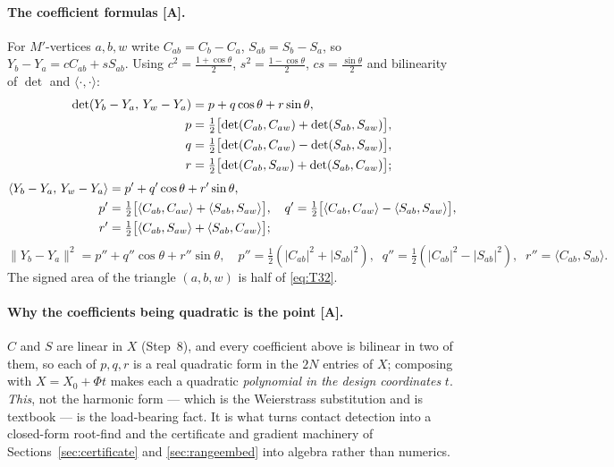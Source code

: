 \documentclass[11pt,a4paper]{article}
\theoremstyle{definition}
\newcommand{\Mprime}{M'}
\begin{document}
\paragraph{The coefficient formulas [A].} For $\Mprime$-vertices $a,b,w$ write
$C_{ab}=C_b-C_a$, $S_{ab}=S_b-S_a$, so $Y_b-Y_a=cC_{ab}+sS_{ab}$. Using
$c^2=\tfrac{1+\cos\theta}{2}$, $s^2=\tfrac{1-\cos\theta}{2}$, $cs=\tfrac{\sin\theta}{2}$ and
bilinearity of $\det$ and $\langle\cdot,\cdot\rangle$:
\begin{align}
\det(Y_b-Y_a,\,Y_w-Y_a) &= p+q\cos\theta+r\sin\theta, \notag\\
p &= \tfrac12\bigl[\det(C_{ab},C_{aw})+\det(S_{ab},S_{aw})\bigr], \notag\\
q &= \tfrac12\bigl[\det(C_{ab},C_{aw})-\det(S_{ab},S_{aw})\bigr],
\label{eq:T32}\\
r &= \tfrac12\bigl[\det(C_{ab},S_{aw})+\det(S_{ab},C_{aw})\bigr]; \notag
\end{align}
\begin{align}
\langle Y_b-Y_a,\,Y_w-Y_a\rangle &= p'+q'\cos\theta+r'\sin\theta, \notag\\
p' &= \tfrac12\bigl[\langle C_{ab},C_{aw}\rangle+\langle S_{ab},S_{aw}\rangle\bigr],\quad
q' = \tfrac12\bigl[\langle C_{ab},C_{aw}\rangle-\langle S_{ab},S_{aw}\rangle\bigr],
\label{eq:T33}\\
r' &= \tfrac12\bigl[\langle C_{ab},S_{aw}\rangle+\langle S_{ab},C_{aw}\rangle\bigr];\notag
\end{align}
\begin{equation}
\|Y_b-Y_a\|^2 = p''+q''\cos\theta+r''\sin\theta,\quad
p''=\tfrac12(|C_{ab}|^2+|S_{ab}|^2),\;\;
q''=\tfrac12(|C_{ab}|^2-|S_{ab}|^2),\;\;
r''=\langle C_{ab},S_{ab}\rangle .
\label{eq:T34}
\end{equation}
The signed area of the triangle $(a,b,w)$ is half of \eqref{eq:T32}.

\paragraph{Why the coefficients being quadratic is the point [A].} $C$ and $S$ are linear in
$X$ (Step~8), and every coefficient above is bilinear in two of them, so each of $p,q,r$ is a
real quadratic form in the $2N$ entries of $X$; composing with $X=X_0+\Phi t$ makes each a
quadratic \emph{polynomial in the design coordinates} $t$. \emph{This}, not the harmonic form
--- which is the Weierstrass substitution and is textbook --- is the load-bearing fact. It is
what turns contact detection into a closed-form root-find and the certificate and gradient
machinery of Sections~\ref{sec:certificate} and \ref{sec:rangeembed} into algebra rather than
numerics.
\end{document}
